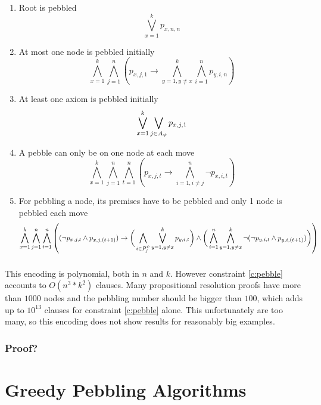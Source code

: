 \documentclass{llncs}
\begin{document}
\begin{enumerate}
	\item Root is pebbled
				$$\bigvee_{x = 1}^k p_{x,n,n}$$
				
	\item At most one node is pebbled initially\\
				$$\bigwedge_{x = 1}^k \bigwedge_{j = 1}^n \left( p_{x,j,1} \rightarrow \bigwedge_{y = 1, y \neq x}^k \bigwedge_{i = 1}^n p_{y,i,n} \right)$$
	
	\item At least one axiom is pebbled initially\\
				$$\bigvee_{x = 1}^k \bigvee_{j \in A_{\psi}} p_{x,j,1}$$
				
	\item A pebble can only be on one node at each move
				$$\bigwedge_{x = 1}^k \bigwedge_{j = 1}^n \bigwedge_{t = 1}^n \left( p_{x,j,t} \rightarrow \bigwedge_{i = 1, i \neq j}^n \neg p_{x,i,t} \right)$$ 
				
	\item \label{c:pebble} For pebbling a node, its premises have to be pebbled and only 1 node is pebbled each move\\
				$$\bigwedge_{x = 1}^k \bigwedge_{j = 1}^n \bigwedge_{t = 1}^n \left( (\neg p_{x,j,t} \wedge p_{x,j,(t+1)} ) \rightarrow 
					\bigg( \bigwedge_{i \in P_{j}^{\psi}} \bigvee_{y = 1, y \neq x}^k p_{y,i,t} \bigg) \wedge 
					\bigg( \bigwedge_{i = 1}^n \bigwedge_{y = 1, y \neq x}^k \neg ( \neg p_{y,i,t} \wedge p_{y,i,(t+1)} ) \bigg) \right)$$
				
\end{enumerate}
\subsubsection*{}
This encoding is polynomial, both in $n$ and $k$. However constraint \ref{c:pebble} accounts to $O(n^3*k^2)$ clauses. Many propositional resolution proofs have more than $1000$ nodes and the pebbling number should be bigger than $100$, which adds up to $10^{13}$ clauses for constraint \ref{c:pebble} alone. This unfortunately are too many, so this encoding does not show results for reasonably big examples.

\subsubsection*{Proof?}

\section{Greedy Pebbling Algorithms}
\label{section:algorithms}
\end{document}
